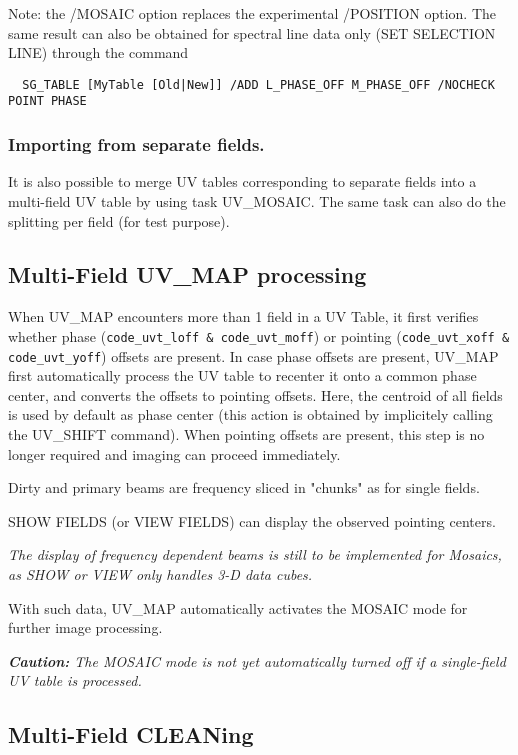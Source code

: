 \documentclass[11pt]{article}
\begin{document}
Note: the /MOSAIC option replaces the experimental /POSITION option.
The same result can also be obtained for spectral line
data only (SET SELECTION LINE) through the  command
\begin{verbatim}
  SG_TABLE [MyTable [Old|New]] /ADD L_PHASE_OFF M_PHASE_OFF /NOCHECK POINT PHASE
\end{verbatim}

\subsubsection{Importing from separate fields.}

It is also possible to merge UV tables corresponding to separate fields into a
multi-field UV table by using task UV\_MOSAIC. The same task can also do the splitting
per field (for test purpose).

\subsection{Multi-Field UV\_MAP processing}

When UV\_MAP encounters more than 1 field in a UV Table, it first verifies whether
phase (\texttt{code\_uvt\_loff \& code\_uvt\_moff}) or pointing 
(\texttt{code\_uvt\_xoff \& code\_uvt\_yoff})
offsets are present.  In case phase offsets are present, UV\_MAP first automatically process
the UV table to recenter it onto a common phase center, and converts the offsets
to pointing offsets. Here, the centroid of all fields is used by default as phase
center (this action is obtained by implicitely calling the UV\_SHIFT command). 
When pointing offsets are present, this step is no longer required and
imaging can proceed immediately. 

Dirty and primary beams are frequency sliced in "chunks" as for single fields.

SHOW FIELDS (or VIEW FIELDS) can display the observed pointing centers.


\textit{The display of frequency dependent beams is still to be implemented for
Mosaics, as SHOW or VIEW only handles 3-D data cubes.}

With such data, UV\_MAP automatically activates the MOSAIC mode for further image processing.

\textit{\textbf{Caution:} The MOSAIC mode is not yet automatically turned off
if a single-field UV table is processed.}

\subsection{Multi-Field CLEANing}
\end{document}

